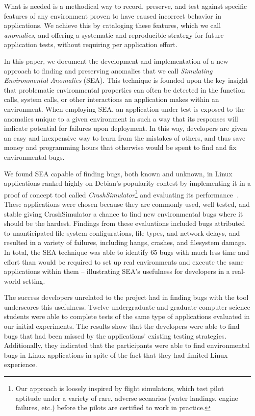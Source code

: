 What is needed is a methodical way to record, preserve, and test against
specific features of any environment proven to have caused incorrect
behavior in applications. We achieve this by cataloging these
features, which we call \textit{anomalies}, and
offering a systematic and reproducible strategy for
future application tests, without
requiring per application effort.

In  this paper, we document the development and implementation of a new
approach to finding and preserving anomalies that we call \textit{Simulating
Environmental Anomalies} (SEA). This technique is founded upon the key
insight that problematic environmental properties can often be detected
in the function calls, system
calls, or other interactions an application makes within an
environment. When employing SEA,
an application under test is exposed
to the anomalies unique to a given environment
in such a way that its responses will indicate
potential for failures upon deployment. In this way, developers are given
an easy and inexpensive way to learn from the mistakes of others, and
thus save money and programming hours that otherwise would be spent to
find and fix environmental bugs.

We found SEA capable of finding bugs,
both known and unknown,
in Linux applications ranked
highly on Debian's popularity contest
by implementing it in a proof of concept tool
called {\em CrashSimulator}\footnote{Our approach is
loosely inspired by flight simulators, which test pilot aptitude under a
variety of rare, adverse scenarios (water landings, engine failures,
etc.) before the pilots are certified to work in practice.}
and evaluating its performance~\cite{DebPopCon}.
These applications were chosen
because they are commonly used,
well tested,
and stable giving CrashSimulator a chance to find new
environmental bugs where it should be the hardest.
Findings from these evaluations included bugs
attributed to
unanticipated file system configurations, file types, and network delays,
and resulted in a variety of failures, including hangs, crashes, and
filesystem damage.  In total, the SEA technique was able to identify 65
bugs with much less
time and effort than would be required to set up real environments and
execute the same applications within them -- illustrating SEA's
usefulness for developers in a real-world setting.

The success developers unrelated to the project had in finding bugs
with the tool underscores this usefulness.
Twelve undergraduate and graduate computer science
students were able to complete tests of the same type of applications
evaluated in our initial experiments. The results show that the
developers were able to find bugs that had been missed by the
applications' existing testing strategies. Additionally,
they indicated that
the participants were able to find environmental bugs in
Linux applications in spite of the
fact that they had limited Linux experience.

